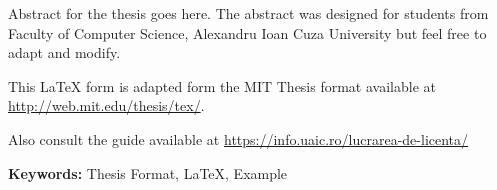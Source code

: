 

Abstract for the thesis goes here. The abstract was designed for students from Faculty of Computer Science, Alexandru Ioan Cuza University but feel free to adapt and modify. 

This LaTeX form is adapted form the MIT Thesis format available at \url{http://web.mit.edu/thesis/tex/}.

Also consult the guide available at \url{https://info.uaic.ro/lucrarea-de-licenta/}
\vspace{0.5cm}

\textbf{Keywords:} Thesis Format, LaTeX, Example
